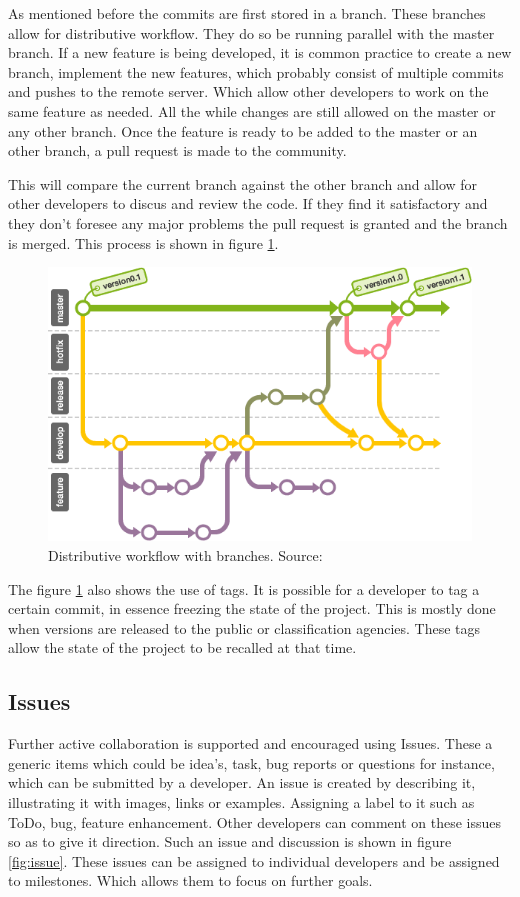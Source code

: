 \documentclass[fleqn,10pt]{SelfArx} %
\begin{document}
As mentioned before the commits are first stored in a branch. These branches allow for distributive workflow. They do so be running parallel with the master branch. If a new feature is being developed, it is common practice to create a new branch, implement the new features, which probably consist of multiple commits and pushes to the remote server. Which allow other developers to work on the same feature as needed. All the while changes are still allowed on the master or any other branch. Once the feature is ready to be added to the master or an other branch, a pull request is made to the community.

This will compare the current branch against the other branch and allow for other developers to discus and review the code. If they find it satisfactory and they don't foresee any major problems the pull request is granted and the branch is merged. This process is shown in figure \ref{fig:branchworkflow}.

\begin{figure}[ht]\centering
	\includegraphics[width=\textwidth/2]{../images/stepup.png}
	\caption{Distributive workflow with branches. Source: \citeauthor{backlog_branching_2015}\cite{backlog_branching_2015} }\label{fig:branchworkflow}
\end{figure}

The figure \ref{fig:branchworkflow} also shows the use of tags. It is possible for a developer to tag a certain commit, in essence freezing the state of the project. This is mostly done when versions are released to the public or classification agencies. These tags allow the  state of the project to be recalled at that time.

\subsection{Issues}
Further active collaboration is supported and encouraged using Issues. These a generic items which could be idea's, task, bug reports or questions for instance, which can be submitted by a developer. An issue is created by describing it, illustrating it with images, links or examples. Assigning a label to it such as ToDo, bug, feature enhancement. Other developers can comment on these issues so as to give it direction. Such an issue and discussion is shown in figure \ref{fig:issue}. These issues can be assigned to individual developers and be assigned to milestones. Which allows them to focus on further goals.
\end{document}

